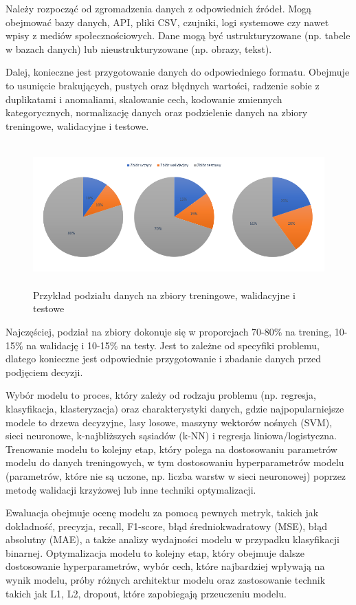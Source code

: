Należy rozpocząć od zgromadzenia danych z odpowiednich źródeł.
Mogą obejmować bazy danych, API, pliki CSV, czujniki, logi systemowe czy nawet wpisy z mediów społecznościowych.
Dane mogą być ustrukturyzowane (np. tabele w bazach danych) lub nieustrukturyzowane (np. obrazy, tekst).

Dalej, konieczne jest przygotowanie danych do odpowiedniego formatu.
Obejmuje to usunięcie brakujących, pustych oraz błędnych wartości,
radzenie sobie z duplikatami i anomaliami, skalowanie cech, kodowanie zmiennych kategorycznych,
normalizację danych oraz podzielenie danych na zbiory treningowe, walidacyjne i testowe.

\begin{figure}[ht]
	\centering
	\includegraphics[height=5.5cm]{partials/images/machine_learning_process_1.png}
	\caption{Przykład podziału danych na zbiory treningowe, walidacyjne i testowe}
    \label{Fig:ml-process-1}
\end{figure}

Najczęściej, podział na zbiory dokonuje się w proporcjach 70-80\% na trening, 10-15\% na walidację i 10-15\% na testy.
Jest to zależne od specyfiki problemu,
dlatego konieczne jest odpowiednie przygotowanie i zbadanie danych przed podjęciem decyzji.

Wybór modelu to proces, który zależy od rodzaju problemu (np. regresja, klasyfikacja, klasteryzacja)
oraz charakterystyki danych, gdzie najpopularniejsze modele to drzewa decyzyjne,
lasy losowe, maszyny wektorów nośnych (SVM), sieci neuronowe, k-najbliższych sąsiadów (k-NN)
i regresja liniowa/logistyczna. Trenowanie modelu to kolejny etap,
który polega na dostosowaniu parametrów modelu do danych treningowych,
w tym dostosowaniu hyperparametrów modelu (parametrów, które nie są uczone,
np. liczba warstw w sieci neuronowej) poprzez metodę walidacji krzyżowej lub inne techniki optymalizacji.

Ewaluacja obejmuje ocenę modelu za pomocą pewnych metryk,
takich jak dokładność, precyzja, recall, F1-score, błąd średniokwadratowy (MSE),
błąd absolutny (MAE), a także analizy wydajności modelu w przypadku klasyfikacji binarnej.
Optymalizacja modelu to kolejny etap, który obejmuje dalsze dostosowanie hyperparametrów,
wybór cech, które najbardziej wpływają na wynik modelu,
próby różnych architektur modelu oraz zastosowanie technik takich jak L1, L2, dropout,
które zapobiegają przeuczeniu modelu.

